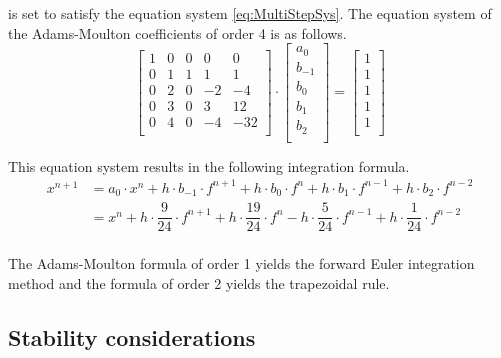 \documentclass[10pt]{report}
\begin{document}
is set to satisfy the equation system \eqref{eq:MultiStepSys}.  The
equation system of the Adams-Moulton coefficients of order 4 is as
follows.
\begin{equation}
\left[\begin{array}{lrrrr}
1 & 0 &  0 &   0 &    0\\
0 & 1 &  1 &   1 &    1\\
0 & 2 &  0 &  -2 &   -4\\
0 & 3 &  0 &   3 &   12\\
0 & 4 &  0 &  -4 &  -32\\
\end{array}\right]
\cdot
\begin{bmatrix}
a_0\\
b_{-1}\\
b_0\\
b_1\\
b_2\\
\end{bmatrix}
=
\begin{bmatrix}
1\\
1\\
1\\
1\\
1\\
\end{bmatrix}
\end{equation}

This equation system results in the following integration formula.
\begin{equation}
\label{eq:MoultonInt}
\begin{split}
x^{n+1} &= a_0\cdot x^{n} + h\cdot b_{-1}\cdot f^{n+1} + h\cdot b_{0}\cdot f^{n} + h\cdot b_{1}\cdot f^{n-1} + h\cdot b_{2}\cdot f^{n-2}\\
&= x^{n} + h\cdot \dfrac{9}{24}\cdot f^{n+1} + h\cdot \dfrac{19}{24}\cdot f^{n} - h\cdot \dfrac{5}{24}\cdot f^{n-1} + h\cdot \dfrac{1}{24}\cdot f^{n-2}\\
\end{split}
\end{equation}

The Adams-Moulton formula of order 1 yields the forward Euler
integration method and the formula of order 2 yields the trapezoidal
rule.

\subsection{Stability considerations}
\end{document}
